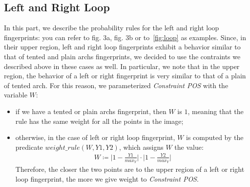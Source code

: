 \documentclass[8pt]{article}
\begin{document}
\subsection{Left and Right Loop}
%
In this part, we describe the probability rules for the left and right loop
fingerprints: you can refer to fig. 3a, fig. 3b or to~\cref{fig:loop} as examples.
Since, in their upper region, left and right loop fingerprints exhibit a behavior similar
to that of tented and plain archs fingerprints, we decided to use the
contraints we described above in these cases as well. In particular, we
note that in the upper region, the behavior of a left or right fingerprint is
very similar to that of a plain of tented arch. For this reason, we
parameterized \emph{Constraint POS} with the variable $W$:
  \begin{itemize}
    \item
      if we have a tented or plain archs fingerprint, then $W$ is $1$, meaning
      that the rule has the same weight for all the points in the image;
    \item
      otherwise, in the case of left or right loop fingerprint, $W$ is
      computed by the predicate $weight\_rule(W,Y1,Y2)$, which assigns 
      $W$ the value:
        \begin{align*}
          W \coloneqq 
          \lvert 1-\frac{Y1}{max_Y} \rvert 
          \cdot 
          \lvert 1-\frac{Y2}{max_Y} \rvert
        \end{align*}
      Therefore, the closer the two points are to the upper region of a
      left or right loop fingerprint, the more we give weight to \emph{Constraint POS}.
  \end{itemize}
\end{document}
